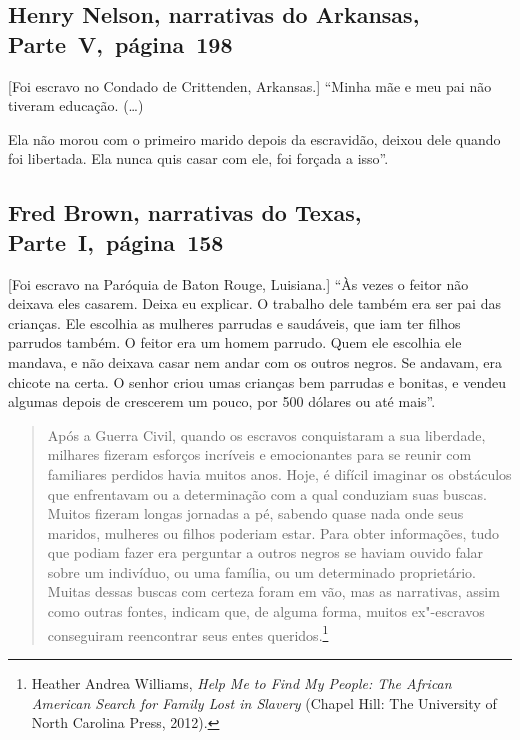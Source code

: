 \subsection{Henry Nelson, narrativas do Arkansas, Parte~V,~página~198}

{[}Foi escravo no Condado de Crittenden, Arkansas.{]} ``Minha mãe e meu pai não tiveram educação. (\ldots{})

Ela não morou com o primeiro marido depois da escravidão, deixou dele
quando foi libertada. Ela nunca quis casar com ele, foi forçada a isso''.

\subsection{Fred Brown, narrativas do Texas, Parte~I,~página~158} \label{ref36}

{[}Foi escravo na Paróquia de Baton Rouge, Luisiana.{]} ``Às vezes o feitor não deixava eles casarem. Deixa eu explicar. O
trabalho dele também era ser pai das crianças. Ele escolhia as mulheres
parrudas e saudáveis, que iam ter filhos parrudos também. O feitor era
um homem parrudo. Quem ele escolhia ele mandava, e não deixava casar nem
andar com os outros negros. Se andavam, era chicote na certa. O senhor
criou umas crianças bem parrudas e bonitas, e vendeu algumas depois de
crescerem um pouco, por 500 dólares ou até mais''.

\begin{quote}
Após a Guerra Civil, quando os escravos conquistaram a sua
liberdade, milhares fizeram esforços incríveis e emocionantes para se
reunir com familiares perdidos havia muitos anos. Hoje, é difícil
imaginar os obstáculos que enfrentavam ou a determinação com a qual
conduziam suas buscas. Muitos fizeram longas jornadas a pé, sabendo
quase nada onde seus maridos, mulheres ou filhos poderiam estar. Para
obter informações, tudo que podiam fazer era perguntar a outros negros
se haviam ouvido falar sobre um indivíduo, ou uma família, ou um
determinado proprietário. Muitas dessas buscas com certeza foram em vão,
mas as narrativas, assim como outras fontes, indicam que, de alguma
forma, muitos ex"-escravos conseguiram reencontrar seus entes
queridos.\footnote{Heather Andrea Williams, \emph{Help Me to Find My
  People: The African American Search for Family Lost in Slavery}
  (Chapel Hill: The University of North Carolina Press, 2012).}
\end{quote}


